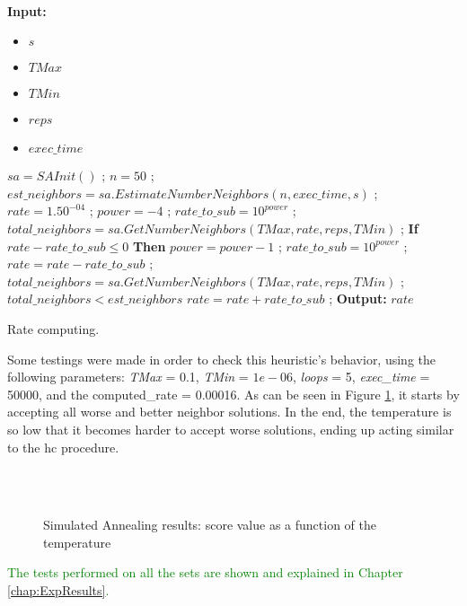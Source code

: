 {\\
\begin{algorithm}[t!]
\textbf{Input:} 
\begin{itemize}
	\setlength{\itemsep}{1pt}
	\item $s$ 
	\item $TMax$ 
	\item $TMin$ 
	\item $reps$ 
	\item $exec\_time$ 
\end{itemize}
\begin{algorithmic}
\State $sa = SAInit()$ ;
\State $n = 50$ ; 
\State $est\_neighbors = sa.EstimateNumberNeighbors(n, exec\_time, s)$ ;
\State $rate = 1.50^{-04}$ ;
\State $power = -4$ ;
\State $rate\_to\_sub = 10^{power}$ ;
\State $total\_neighbors = sa.GetNumberNeighbors(TMax, rate, reps, TMin)$ ;
\Repeat	
	\State \textbf{If} $rate - rate\_to\_sub \leq 0$ \textbf{Then} $power = power - 1$ ; $rate\_to\_sub = 10^{power}$ ;
	\State $rate = rate - rate\_to\_sub$ ;
	\State $total\_neighbors = sa.GetNumberNeighbors(TMax, rate, reps, TMin)$ ;
\Until $total\_neighbors < est\_neighbors$
\State $rate = rate + rate\_to\_sub$ ; 
\State \textbf{Output:} $rate$ 
\end{algorithmic}
\caption{Rate computing.}
\label{alg:RateComputing}
\end{algorithm}Some testings were made in order to check this heuristic's behavior, using the following parameters: \textit{TMax} = 0.1, \textit{TMin} = $1e-06$, \textit{loops} = 5, \textit{exec\_time} = 50000, and the computed\_rate = 0.00016. As can be seen in Figure \ref{fig:SimulatedAnnealingPlot}, it starts by accepting all worse and better neighbor solutions. In the end, the temperature is so low that it becomes harder to accept worse solutions, ending up acting similar to the \gls{hc} procedure.}\\
\\
\begin{figure}[!t]
\centering


\caption{Simulated Annealing results: score value as a function of the temperature} 
\label{fig:SimulatedAnnealingPlot}
\end{figure}\textcolor{green}{The tests performed on all the sets are shown and explained in Chapter \ref{chap:ExpResults}.}

